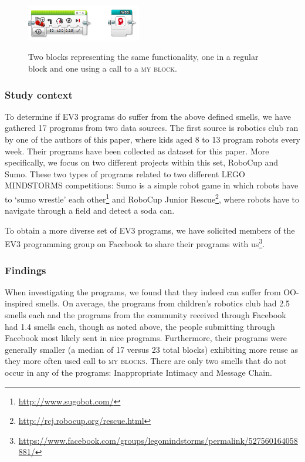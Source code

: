 \documentclass{sig-alternate}
\newcommand{\mbs}{\textsc{my blocks}}
\newcommand{\mb}{\textsc{my block}}
\begin{document}
\begin{figure} [ht]
\caption{Two blocks representing the same functionality, one in a regular block and one using a call to a \mb.}
\centering
\includegraphics[width=5cm]{img/weg}
\label{fig:weg}
\end{figure}

\subsubsection{Study context}
To determine if EV3 programs do suffer from the above defined smells, we have gathered 17 programs from two data sources. The first source is robotics club ran by one of the authors of this paper, where kids aged 8 to 13 program robots every week. Their programs have been collected as dataset for this paper. More specifically, we focus on two different projects within this set, RoboCup and Sumo. These two types of programs related to two different LEGO MINDSTORMS competitions: Sumo is a simple robot game in which robots have to `sumo wrestle' each other\footnote{\url{http://www.sugobot.com/}} and RoboCup Junior Rescue\footnote{\url{http://rcj.robocup.org/rescue.html}}, where robots have to navigate through a field and detect a soda can.

To obtain a more diverse set of EV3 programs, we have solicited members of the EV3 programming group on Facebook to share their programs with us\footnote{\url{https://www.facebook.com/groups/legomindstorms/permalink/527560164058881/}}.

\subsubsection{Findings}
When investigating the programs, we found that they indeed can suffer from OO-inspired smells. On average, the programs from children's robotics club had 2.5 smells each and the programs from the community received through Facebook had 1.4 smells each, though as noted above, the people submitting through Facebook most likely sent in nice programs. Furthermore, their programs were generally smaller (a median of 17 versus 23 total blocks) exhibiting more reuse as they more often used call to \mbs. There are only two smells that do not occur in any of the programs: Inappropriate Intimacy and Message Chain.
\end{document}
